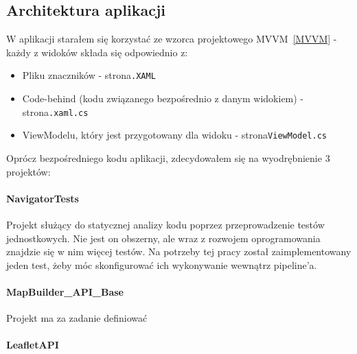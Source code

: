 \subsection{Architektura aplikacji}

W aplikacji starałem się korzystać ze wzorca projektowego MVVM~\ref{MVVM} - 
każdy z widoków składa się odpowiednio z:
\begin{itemize}
    \item Pliku znaczników - strona\verb|.XAML|
    \item Code-behind (kodu związanego bezpośrednio z danym widokiem) - strona\verb|.xaml.cs|
    \item ViewModelu, który jest przygotowany dla widoku - strona\verb|ViewModel.cs|
\end{itemize}


Oprócz bezpośredniego kodu aplikacji, zdecydowałem się na wyodrębnienie 3 projektów:

\paragraph{NavigatorTests}
Projekt służący do statycznej analizy kodu poprzez przeprowadzenie testów jednostkowych.
Nie jest on obszerny, ale wraz z rozwojem oprogramowania znajdzie się w nim więcej 
testów. Na potrzeby tej pracy został zaimplementowany jeden test, żeby móc skonfigurować 
ich wykonywanie wewnątrz pipeline'a.

\paragraph{MapBuilder_API_Base}
Projekt ma za zadanie definiować 

\paragraph{LeafletAPI}

